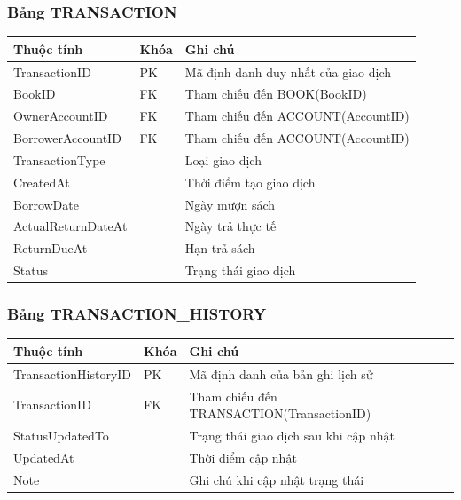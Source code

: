 \documentclass{article}
\begin{document}
\subsubsection*{Bảng TRANSACTION}
{\small
\begin{longtable}{L{0.28\textwidth}L{0.12\textwidth}L{0.52\textwidth}}
\toprule
\textbf{Thuộc tính} & \textbf{Khóa} & \textbf{Ghi chú} \\
\midrule
TransactionID & PK & Mã định danh duy nhất của giao dịch \\
BookID & FK & Tham chiếu đến BOOK(BookID) \\
OwnerAccountID & FK & Tham chiếu đến ACCOUNT(AccountID) \\
BorrowerAccountID & FK & Tham chiếu đến ACCOUNT(AccountID) \\
TransactionType & & Loại giao dịch \\
CreatedAt & & Thời điểm tạo giao dịch \\
BorrowDate & & Ngày mượn sách \\
ActualReturnDateAt & & Ngày trả thực tế \\
ReturnDueAt & & Hạn trả sách \\
Status & & Trạng thái giao dịch \\
\bottomrule
\end{longtable}
}

\subsubsection*{Bảng TRANSACTION\_HISTORY}
{\small
\begin{longtable}{L{0.28\textwidth}L{0.12\textwidth}L{0.52\textwidth}}
\toprule
\textbf{Thuộc tính} & \textbf{Khóa} & \textbf{Ghi chú} \\
\midrule
TransactionHistoryID & PK & Mã định danh của bản ghi lịch sử \\
TransactionID & FK & Tham chiếu đến TRANSACTION(TransactionID) \\
StatusUpdatedTo & & Trạng thái giao dịch sau khi cập nhật \\
UpdatedAt & & Thời điểm cập nhật \\
Note & & Ghi chú khi cập nhật trạng thái \\
\bottomrule
\end{longtable}
}
\end{document}
